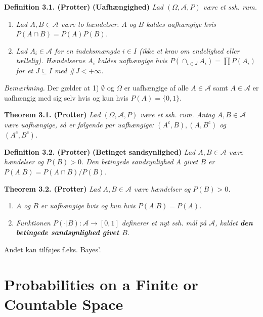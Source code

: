 \documentclass[
]{book}
\providecommand{\tightlist}{%
  \setlength{\itemsep}{0pt}\setlength{\parskip}{0pt}}
\begin{document}
\textbf{Definition 3.1. (Protter)} \textbf{(Uafhængighed)} \emph{Lad \((\Omega,\mathcal{A},P)\) være et ssh. rum.}

\begin{enumerate}
\def\labelenumi{\alph{enumi}.}
\tightlist
\item
  \emph{Lad \(A,B\in\mathcal{A}\) være to hændelser. \(A\) og \(B\) kaldes uafhængige hvis \(P(A\cap B)=P(A)P(B)\).}
\item
  \emph{Lad \(A_i\in\mathcal{A}\) for en indeksmængde \(i\in I\) (ikke et krav om endelighed eller tællelig). Hændelserne \(A_i\) kaldes uafhængige hvis \(P(\cap_{i\in J}A_i)=\prod P(A_i)\) for et \(J\subseteq I\) med \(\# J< +\infty\).}
\end{enumerate}

\emph{Bemærkning.} Der gælder at 1) \(\emptyset\) og \(\Omega\) er uafhængige af alle \(A\in\mathcal{A}\) samt \(A\in\mathcal{A}\) er uafhængig med sig selv hvis og kun hvis \(P(A)=\{0,1\}\).

\textbf{Theorem 3.1. (Protter)} \emph{Lad \((\Omega,\mathcal{A},P)\) være et ssh. rum. Antag \(A,B\in\mathcal{A}\) være uafhængige, så er følgende par uafhængige: \((A^c,B),(A,B^c)\) og \((A^c,B^c)\).}

\textbf{Definition 3.2. (Protter)} \textbf{(Betinget sandsynlighed)} \emph{Lad \(A,B\in\mathcal{A}\) være hændelser og \(P(B)>0\). Den betingede sandsynlighed \(A\) givet \(B\) er \(P(A\vert B)=P(A\cap B)/P(B)\).}

\textbf{Theorem 3.2. (Protter)} \emph{Lad \(A,B\in\mathcal{A}\) være hændelser og \(P(B)>0\).}

\begin{enumerate}
\def\labelenumi{\alph{enumi}.}
\tightlist
\item
  \emph{\(A\) og \(B\) er uafhængige hvis og kun hvis \(P(A\vert B)=P(A)\).}
\item
  \emph{Funktionen \(P(\cdot \vert B) : \mathcal{A} \to [0,1]\) definerer et nyt ssh. mål på \(\mathcal{A}\), kaldet \textbf{den betingede sandsynlighed givet \(B\)}.}
\end{enumerate}

Andet kan tilføjes f.eks. Bayes'.

\hypertarget{probabilities-on-a-finite-or-countable-space}{%
\section{Probabilities on a Finite or Countable Space}\label{probabilities-on-a-finite-or-countable-space}}
\end{document}
